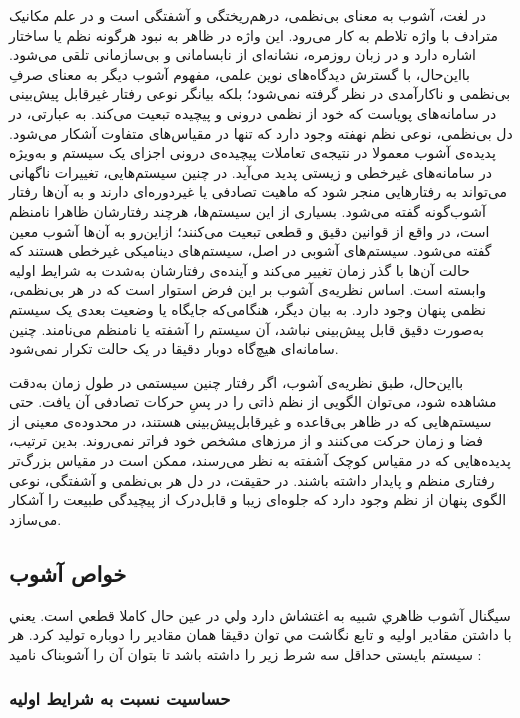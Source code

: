 در لغت، آشوب به معنای بی‌نظمی، درهم‌ریختگی و آشفتگی است و در علم مکانیک مترادف با واژه تلاطم به کار می‌رود. این واژه در ظاهر به نبود هرگونه نظم یا ساختار اشاره دارد و در زبان روزمره، نشانه‌ای از نابسامانی و بی‌سازمانی تلقی می‌شود. بااین‌حال، با گسترش دیدگاه‌های نوین علمی، مفهوم آشوب دیگر به معنای صرفِ بی‌نظمی و ناکارآمدی در نظر گرفته نمی‌شود؛ بلکه بیانگر نوعی رفتار غیرقابل پیش‌بینی در سامانه‌های پویاست که خود از نظمی درونی و پیچیده تبعیت می‌کند. به عبارتی، در دل بی‌نظمی، نوعی نظم نهفته وجود دارد که تنها در مقیاس‌های متفاوت آشکار می‌شود. پدیده‌ی آشوب معمولا در نتیجه‌ی تعاملات پیچیده‌ی درونی اجزای یک سیستم و به‌ویژه در سامانه‌های غیرخطی و زیستی پدید می‌آید. در چنین سیستم‌هایی، تغییرات ناگهانی می‌تواند به رفتارهایی منجر شود که ماهیت تصادفی یا غیر‌دوره‌ای دارند و به آن‌ها رفتار آشوب‌گونه گفته می‌شود. بسیاری از این سیستم‌ها، هرچند رفتارشان ظاهرا نامنظم است، در واقع از قوانین دقیق و قطعی تبعیت می‌کنند؛ ازاین‌رو به آن‌ها آشوب معین گفته می‌شود. سیستم‌های آشوبی در اصل، سیستم‌های دینامیکی غیرخطی هستند که حالت آن‌ها با گذر زمان تغییر می‌کند و آینده‌ی رفتارشان به‌شدت به شرایط اولیه وابسته است. اساس نظریه‌ی آشوب بر این فرض استوار است که در هر بی‌نظمی، نظمی پنهان وجود دارد. به بیان دیگر، هنگامی‌که جایگاه یا وضعیت بعدی یک سیستم به‌صورت دقیق قابل پیش‌بینی نباشد، آن سیستم را آشفته یا نامنظم می‌نامند. چنین سامانه‌ای هیچ‌گاه دوبار دقیقا در یک حالت تکرار نمی‌شود.

بااین‌حال، طبق نظریه‌ی آشوب، اگر رفتار چنین سیستمی در طول زمان به‌دقت مشاهده شود، می‌توان الگویی از نظم ذاتی را در پسِ حرکات تصادفی آن یافت. حتی سیستم‌هایی که در ظاهر بی‌قاعده و غیرقابل‌پیش‌بینی هستند، در محدوده‌ی معینی از فضا و زمان حرکت می‌کنند و از مرزهای مشخص خود فراتر نمی‌روند. بدین ترتیب، پدیده‌هایی که در مقیاس کوچک آشفته به نظر می‌رسند، ممکن است در مقیاس بزرگ‌تر رفتاری منظم و پایدار داشته باشند. در حقیقت، در دل هر بی‌نظمی و آشفتگی، نوعی الگوی پنهان از نظم وجود دارد که جلوه‌ای زیبا و قابل‌درک از پیچیدگی طبیعت را آشکار می‌سازد\cite{ref46}.

\subsection{خواص آشوب}

سيگنال آشوب ظاهري شبيه به اغتشاش  دارد ولي در عين حال كاملا قطعي است. يعني با داشتن مقادير اوليه و تابع نگاشت مي توان دقيقا همان مقادير را دوباره توليد كرد. هر سیستم بایستی حداقل سه شرط زیر را داشته باشد تا بتوان آن را آشوبناک نامید \cite{ref21}:

\subsubsection{حساسیت نسبت به شرایط اولیه}

